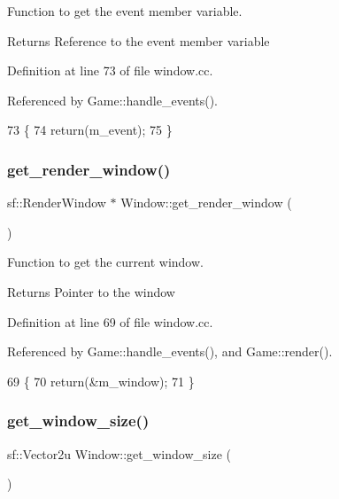 Function to get the event member variable. 

\begin{DoxyReturn}{Returns}
Reference to the event member variable 
\end{DoxyReturn}


Definition at line 73 of file window.\+cc.



Referenced by Game\+::handle\+\_\+events().


\begin{DoxyCode}
73                            \{
74     \textcolor{keywordflow}{return}(m\_event);
75 \}
\end{DoxyCode}
\mbox{\label{class_window_ae921197766adfddd372dcc40879f8b45}} 
\subsubsection{\texorpdfstring{get\+\_\+render\+\_\+window()}{get\_render\_window()}}
{\footnotesize\ttfamily sf\+::\+Render\+Window $\ast$ Window\+::get\+\_\+render\+\_\+window (\begin{DoxyParamCaption}{ }\end{DoxyParamCaption})}



Function to get the current window. 

\begin{DoxyReturn}{Returns}
Pointer to the window 
\end{DoxyReturn}


Definition at line 69 of file window.\+cc.



Referenced by Game\+::handle\+\_\+events(), and Game\+::render().


\begin{DoxyCode}
69                                           \{
70     \textcolor{keywordflow}{return}(&m\_window);
71 \}
\end{DoxyCode}
\mbox{\label{class_window_a44853817aa046240897d0ce78003bacd}} 
\subsubsection{\texorpdfstring{get\+\_\+window\+\_\+size()}{get\_window\_size()}}
{\footnotesize\ttfamily sf\+::\+Vector2u Window\+::get\+\_\+window\+\_\+size (\begin{DoxyParamCaption}{ }\end{DoxyParamCaption})}



